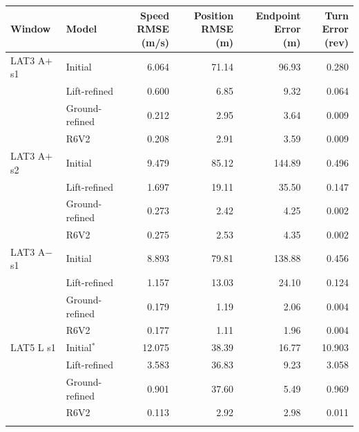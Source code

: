 \begin{center}
\small
\setlength{\tabcolsep}{5pt}
\begin{tabular}{@{}llrrrr@{}}
\toprule
Window & Model & \shortstack{Speed RMSE\\(m/s)} & \shortstack{Position RMSE\\(m)} & \shortstack{Endpoint Error\\(m)} & \shortstack{Turn Error\\(rev)} \\
\midrule
LAT3 A$+$ s1 & Initial & 6.064 & 71.14 & 96.93 & 0.280 \\
 & Lift-refined & 0.600 & 6.85 & 9.32 & 0.064 \\
 & Ground-refined & 0.212 & 2.95 & 3.64 & 0.009 \\
 & R6V2 & 0.208 & 2.91 & 3.59 & 0.009 \\
\addlinespace[2pt]
LAT3 A$+$ s2 & Initial & 9.479 & 85.12 & 144.89 & 0.496 \\
 & Lift-refined & 1.697 & 19.11 & 35.50 & 0.147 \\
 & Ground-refined & 0.273 & 2.42 & 4.25 & 0.002 \\
 & R6V2 & 0.275 & 2.53 & 4.35 & 0.002 \\
\addlinespace[2pt]
LAT3 A$-$ s1 & Initial & 8.893 & 79.81 & 138.88 & 0.456 \\
 & Lift-refined & 1.157 & 13.03 & 24.10 & 0.124 \\
 & Ground-refined & 0.179 & 1.19 & 2.06 & 0.004 \\
 & R6V2 & 0.177 & 1.11 & 1.96 & 0.004 \\
\addlinespace[2pt]
LAT5 L s1 & Initial$^{*}$ & 12.075 & 38.39 & 16.77 & 10.903 \\
 & Lift-refined & 3.583 & 36.83 & 9.23 & 3.058 \\
 & Ground-refined & 0.901 & 37.60 & 5.49 & 0.969 \\
 & R6V2 & 0.113 & 2.92 & 2.98 & 0.011 \\
\addlinespace[2pt]
\bottomrule
\end{tabular}
\label{tab:all_windows_0}
\end{center}
